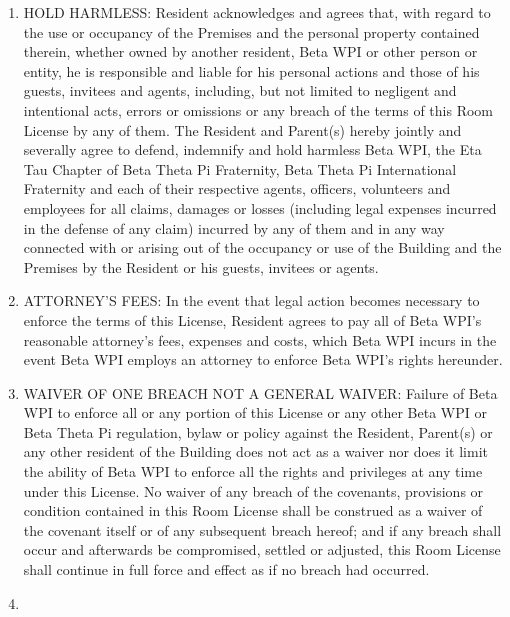 \documentclass[legalpaper, 12pt]{article}
\begin{document}
\begin{enumerate}
\item\label{itm:holdharm}

HOLD HARMLESS\@: Resident acknowledges and agrees that, with regard to the use or occupancy of the Premises and the personal property contained therein, whether owned by another resident, Beta WPI or other person or entity, he is responsible and liable for his personal actions and those of his guests, invitees and agents, including, but not limited to negligent and intentional acts, errors or omissions or any breach of the terms of this Room License by any of them.
The Resident and Parent(s) hereby jointly and severally agree to defend, indemnify and hold harmless Beta WPI, the Eta Tau Chapter of Beta Theta Pi Fraternity, Beta Theta Pi International Fraternity and each of their respective agents, officers, volunteers and employees for all claims, damages or losses (including legal expenses incurred in the defense of any claim) incurred by any of them and in any way connected with or arising out of the occupancy or use of the Building and the Premises by the Resident or his guests, invitees or agents.

\item\label{itm:attorney}

ATTORNEY'S FEES\@: In the event that legal action becomes necessary to enforce the terms of this License, Resident agrees to pay all of Beta WPI’s reasonable attorney’s fees, expenses and costs, which Beta WPI incurs in the event Beta WPI employs an attorney to enforce Beta WPI’s rights hereunder.

\item\label{itm:waiver}

WAIVER OF ONE BREACH NOT A GENERAL WAIVER\@: Failure of Beta WPI to enforce all or any portion of this License or any other Beta WPI or Beta Theta Pi regulation, bylaw or policy against the Resident, Parent(s) or any other resident of the Building does not act as a waiver nor does it limit the ability of Beta WPI to enforce all the rights and privileges at any time under this License.
No waiver of any breach of the covenants, provisions or condition contained in this Room License shall be construed as a waiver of the covenant itself or of any subsequent breach hereof; and if any breach shall occur and afterwards be compromised, settled or adjusted, this Room License shall continue in full force and effect as if no breach had occurred.

\item\label{itm:sublicense}


\end{enumerate}
\end{document}
